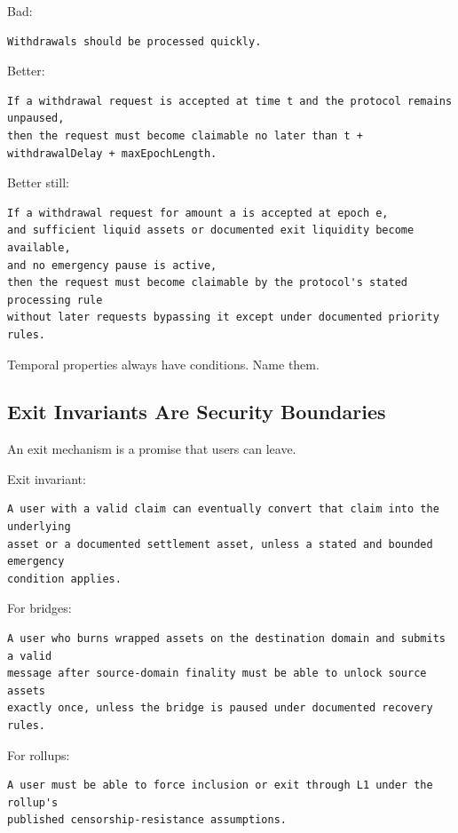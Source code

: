 Bad:

\begin{lstlisting}
Withdrawals should be processed quickly.
\end{lstlisting}

Better:

\begin{lstlisting}
If a withdrawal request is accepted at time t and the protocol remains unpaused,
then the request must become claimable no later than t + withdrawalDelay + maxEpochLength.
\end{lstlisting}

Better still:

\begin{lstlisting}
If a withdrawal request for amount a is accepted at epoch e,
and sufficient liquid assets or documented exit liquidity become available,
and no emergency pause is active,
then the request must become claimable by the protocol's stated processing rule
without later requests bypassing it except under documented priority rules.
\end{lstlisting}

Temporal properties always have conditions. Name them.

\subsection{Exit Invariants Are Security Boundaries}

An exit mechanism is a promise that users can leave.

Exit invariant:

\begin{lstlisting}
A user with a valid claim can eventually convert that claim into the underlying
asset or a documented settlement asset, unless a stated and bounded emergency
condition applies.
\end{lstlisting}

For bridges:

\begin{lstlisting}
A user who burns wrapped assets on the destination domain and submits a valid
message after source-domain finality must be able to unlock source assets
exactly once, unless the bridge is paused under documented recovery rules.
\end{lstlisting}

For rollups:

\begin{lstlisting}
A user must be able to force inclusion or exit through L1 under the rollup's
published censorship-resistance assumptions.
\end{lstlisting}

